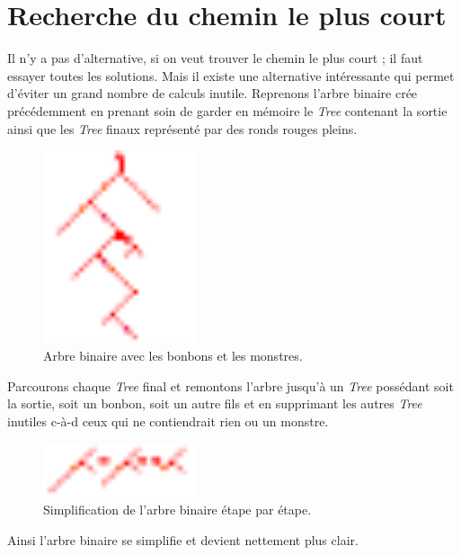 \section{Recherche du chemin le plus court}

Il n'y a pas d'alternative, si on veut trouver le chemin le plus court ; il faut essayer toutes les solutions. Mais il existe une alternative intéressante qui permet d'éviter un grand nombre de calculs inutile. Reprenons l'arbre binaire crée précédemment en prenant soin de garder en mémoire le \textit{Tree} contenant la sortie ainsi que les \textit{Tree} finaux représenté par des ronds rouges pleins.

\begin{figure}[!h]
\centering
\includegraphics[width=0.4\textwidth]{5.recherche/tree.pdf}
\caption{Arbre binaire avec les \textcolor[rgb]{0.91,0.91,0}{bonbons} et les \textcolor[rgb]{0.5,0,1}{monstres}.}
\end{figure}

Parcourons chaque \textit{Tree} final et remontons l'arbre jusqu'à un \textit{Tree} possédant soit la sortie, soit un bonbon, soit un autre fils et en supprimant les autres \textit{Tree} inutiles c-à-d ceux qui ne contiendrait rien ou un monstre.

\begin{figure}[!h]
\centering
\includegraphics[width=0.4\textwidth]{5.recherche/treeStepDelete.pdf}
\caption{Simplification de l'arbre binaire étape par étape.}
\end{figure}

Ainsi l'arbre binaire se simplifie et devient nettement plus clair.

